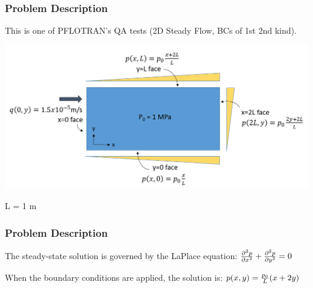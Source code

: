 \documentclass{beamer}
\begin{document}
\begin{frame}\frametitle{Problem Description}

This is one of PFLOTRAN's QA tests (2D Steady Flow, BCs of 1st 2nd kind).

\includegraphics[width=1.2\textheight]{./BC_schematic.png}

L = 1 m

\end{frame}

\begin{frame}\frametitle{Problem Description}

The steady-state solution is governed by the LaPlace equation:
\Large 
\vspace{0.25 in}
${{\partial^{2} p} \over {\partial x^{2}}} + {{\partial^{2} p} \over {\partial y^{2}}} = 0$ 
  
\vspace{0.50 in}  
\normalsize  
When the boundary conditions are applied, the solution is:
\Large 
\vspace{0.25 in}
$p(x,y) = {p_0 \over L} (x+2y)$

\end{frame}
\end{document}
